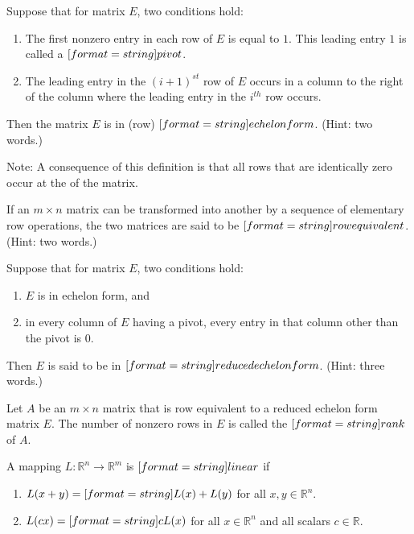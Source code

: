 \documentclass{ximera}
\begin{document}
\begin{question}
Suppose that for matrix $E$, two conditions hold:
\begin{enumerate}
\item The first nonzero entry in each row of $E$ is equal to $1$. This leading entry $1$ is called a 
$[format=string]{pivot}$.
\item The leading entry in the $(i + 1)^{st}$ row of $E$ occurs in a column to the right of the column where the leading entry in the $i^{th}$ row occurs.
\end{enumerate}
Then the matrix $E$ is in (row) $[format=string]{echelon form}$.  (Hint: two words.)

Note: A consequence of this definition is that all rows that are identically zero occur at the  of the matrix.
\end{question} 

\begin{question}
If an $m \times n$ matrix can be transformed into another by a sequence of elementary row operations, the two matrices are said to be $[format=string]{row equivalent}$.  (Hint: two words.)
\end{question} 

\begin{question}
Suppose that for matrix $E$, two conditions hold:
\begin{enumerate}
\item $E$ is in echelon form, and
\item in every column of $E$ having a pivot, every entry in that column other than the pivot is $0$.
\end{enumerate}
Then $E$ is said to be in $[format=string]{reduced echelon form}$.  (Hint: three words.) 
\end{question} 

\begin{question}
Let $A$ be an $m \times n$ matrix that is row equivalent to a reduced echelon form matrix $E$. 
The number of nonzero rows in $E$ is called the $[format=string]{rank}$ of $A$.
\end{question} 

\begin{question}
A mapping $L: \mathbb{R}^n \to \mathbb{R}^m$ is $[format=string]{linear}$ if 
\begin{enumerate}
\item $L(x+y)=[format=string]{L(x)+L(y)}$ for all $x,y\in \mathbb{R}^n$. 
\item $L(cx)=[format=string]{cL(x)}$ for all $x\in \mathbb{R}^n$ and all scalars $c\in \mathbb{R}$.
\end{enumerate}
\end{question} 
\end{document}
